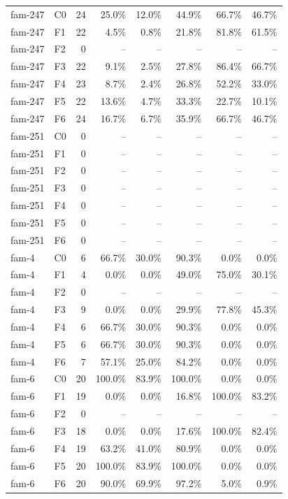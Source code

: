 \begin{tabular}{llrrrrrr}
fam-247 & C0 & 24 & 25.0\% & 12.0\% & 44.9\% & 66.7\% & 46.7\% \\
fam-247 & F1 & 22 & 4.5\% & 0.8\% & 21.8\% & 81.8\% & 61.5\% \\
fam-247 & F2 & 0 & -- & -- & -- & -- & -- \\
fam-247 & F3 & 22 & 9.1\% & 2.5\% & 27.8\% & 86.4\% & 66.7\% \\
fam-247 & F4 & 23 & 8.7\% & 2.4\% & 26.8\% & 52.2\% & 33.0\% \\
fam-247 & F5 & 22 & 13.6\% & 4.7\% & 33.3\% & 22.7\% & 10.1\% \\
fam-247 & F6 & 24 & 16.7\% & 6.7\% & 35.9\% & 66.7\% & 46.7\% \\
fam-251 & C0 & 0 & -- & -- & -- & -- & -- \\
fam-251 & F1 & 0 & -- & -- & -- & -- & -- \\
fam-251 & F2 & 0 & -- & -- & -- & -- & -- \\
fam-251 & F3 & 0 & -- & -- & -- & -- & -- \\
fam-251 & F4 & 0 & -- & -- & -- & -- & -- \\
fam-251 & F5 & 0 & -- & -- & -- & -- & -- \\
fam-251 & F6 & 0 & -- & -- & -- & -- & -- \\
fam-4 & C0 & 6 & 66.7\% & 30.0\% & 90.3\% & 0.0\% & 0.0\% \\
fam-4 & F1 & 4 & 0.0\% & 0.0\% & 49.0\% & 75.0\% & 30.1\% \\
fam-4 & F2 & 0 & -- & -- & -- & -- & -- \\
fam-4 & F3 & 9 & 0.0\% & 0.0\% & 29.9\% & 77.8\% & 45.3\% \\
fam-4 & F4 & 6 & 66.7\% & 30.0\% & 90.3\% & 0.0\% & 0.0\% \\
fam-4 & F5 & 6 & 66.7\% & 30.0\% & 90.3\% & 0.0\% & 0.0\% \\
fam-4 & F6 & 7 & 57.1\% & 25.0\% & 84.2\% & 0.0\% & 0.0\% \\
fam-6 & C0 & 20 & 100.0\% & 83.9\% & 100.0\% & 0.0\% & 0.0\% \\
fam-6 & F1 & 19 & 0.0\% & 0.0\% & 16.8\% & 100.0\% & 83.2\% \\
fam-6 & F2 & 0 & -- & -- & -- & -- & -- \\
fam-6 & F3 & 18 & 0.0\% & 0.0\% & 17.6\% & 100.0\% & 82.4\% \\
fam-6 & F4 & 19 & 63.2\% & 41.0\% & 80.9\% & 0.0\% & 0.0\% \\
fam-6 & F5 & 20 & 100.0\% & 83.9\% & 100.0\% & 0.0\% & 0.0\% \\
fam-6 & F6 & 20 & 90.0\% & 69.9\% & 97.2\% & 5.0\% & 0.9\% \\

\end{tabular}

